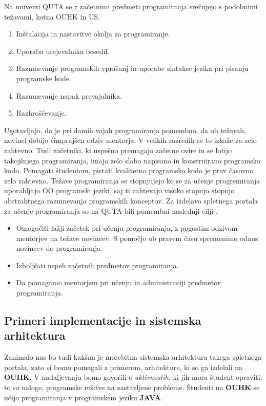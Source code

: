 Na univerzi QUTA se z začetnimi predmeti programiranja srečujejo s
podobnimi težavami, kotna OUHK in US.

\begin{enumerate}
\tightlist
\item Inštalacija in nastavitve okolja za programiranje.
\item Uporaba urejevalnika besedil.
\item Razumevanje programskih vprašanj in uporabe sintakse jezika pri
  pisanju programske kode.
\item  Razumevanje napak prevajalnika.
\item Razhroščevanje.
\end{enumerate}

Ugotavljajo, da je pri damih vajah programiranja pomembno, da ob
težavah, novinci dobijo čimprajšen odziv mentorja. V velikih razredih
se to izkaže za zelo zahtevno. Tudi začetniki, ki uspešno premagajo
začetne ovire in se lotijo takojšnjega programiranja, imajo zelo slabo
napisano in konstruirano programsko kodo. Pomagati študentom, pistati
kvalitetno programsko kodo je prav časovno zelo zahtevno. Težave
programiranja se stopnjujejo ko se za učenje progremiranja uporabljajo
OO programski jeziki, saj ti zahtevajo visoko stopnjo stopnjo
abstraktnega razumevanja programskih konceptov. Za izdelavo spletnega
portala za učenje programiranja so na QUTA bili pomembni naslednji
cilji \cite{thesisAWebP}.

\begin{itemize}
\item Omogočiti lažji začetek pri učenju programiranja, z pogostim
  odzivom mentorjev na težave novincev. S pomočjo ob pravem času
  spremenimo odnos novincev do programiranja.
\item Izboljšati uspeh začetnih predmetov programiranja.
\item Da pomagamo mentorjem pri učenju in administraciji predmetov
  programiranja.
\end{itemize}

\subsection{Primeri implementacije in sistemska arhitektura}
\label{sec:sistemska_arhitektura_All}

Zanimalo nas bo tudi kakšna je morebitna sistemska arhitektura takega
spletnega portala, zato si bomo pomagali z primerom, arhitekture, ki
so ga izdelali na \textbf{OUHK}.  V nadaljevanju bomo govorili o
\emph{aktivnostih}, ki jih mora študent opraviti, to so naloge,
programske rešitve na zastavljene probleme. Študenti na \textbf{OUHK}
se učijo programiranja v programskem jeziku \textbf{JAVA}.

